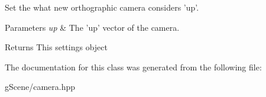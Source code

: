 Set the what new orthographic camera considers 'up'. 


\begin{DoxyParams}{Parameters}
{\em up} & The 'up' vector of the camera. \\
\hline
\end{DoxyParams}
\begin{DoxyReturn}{Returns}
This settings object 
\end{DoxyReturn}


The documentation for this class was generated from the following file\-:\begin{DoxyCompactItemize}
\item 
g\-Scene/camera.\-hpp\end{DoxyCompactItemize}
